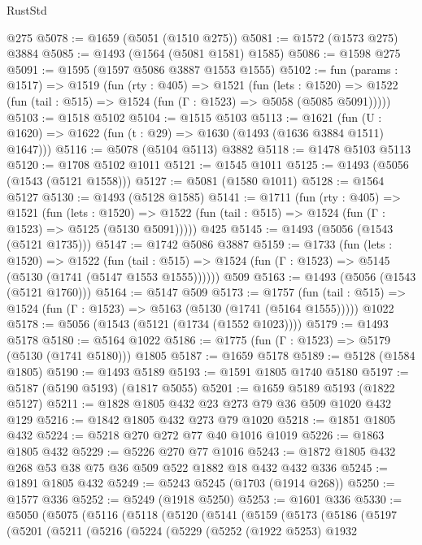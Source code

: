 \begin{lexlean}{RustStd}
\begin{coremodule}
    @275
@5078 := @1659 (@5051 (@1510 @275))
@5081 := @1572 (@1573 @275) @3884
@5085 := @1493 (@1564 (@5081 @1581) @1585)
@5086 := @1598 @275
@5091 := @1595 (@1597 @5086 @3887 @1553 @1555)
@5102 := fun (params : @1517) =>
  @1519
    (fun (rty : @405) =>
    @1521
      (fun (lets : @1520) =>
      @1522 (fun (tail : @515) => @1524 (fun (Γ : @1523) => @5058 (@5085 @5091)))))
@5103 := @1518 @5102
@5104 := @1515 @5103
@5113 := @1621 (fun (U : @1620) => @1622 (fun (t : @29) => @1630 (@1493 (@1636 @3884 @1511) @1647)))
@5116 := @5078 (@5104 @5113) @3882
@5118 := @1478 @5103 @5113
@5120 := @1708 @5102 @1011
@5121 := @1545 @1011
@5125 := @1493 (@5056 (@1543 (@5121 @1558)))
@5127 := @5081 (@1580 @1011)
@5128 := @1564 @5127
@5130 := @1493 (@5128 @1585)
@5141 := @1711
    (fun (rty : @405) =>
    @1521
      (fun (lets : @1520) =>
      @1522 (fun (tail : @515) => @1524 (fun (Γ : @1523) => @5125 (@5130 @5091)))))
    @425
@5145 := @1493 (@5056 (@1543 (@5121 @1735)))
@5147 := @1742 @5086 @3887
@5159 := @1733
    (fun (lets : @1520) =>
    @1522
      (fun (tail : @515) => @1524 (fun (Γ : @1523) => @5145 (@5130 (@1741 (@5147 @1553 @1555))))))
    @509
@5163 := @1493 (@5056 (@1543 (@5121 @1760)))
@5164 := @5147 @509
@5173 := @1757
    (fun (tail : @515) => @1524 (fun (Γ : @1523) => @5163 (@5130 (@1741 (@5164 @1555)))))
    @1022
@5178 := @5056 (@1543 (@5121 (@1734 (@1552 @1023))))
@5179 := @1493 @5178
@5180 := @5164 @1022
@5186 := @1775 (fun (Γ : @1523) => @5179 (@5130 (@1741 @5180))) @1805
@5187 := @1659 @5178
@5189 := @5128 (@1584 @1805)
@5190 := @1493 @5189
@5193 := @1591 @1805 @1740 @5180
@5197 := @5187 (@5190 @5193) (@1817 @5055)
@5201 := @1659 @5189 @5193 (@1822 @5127)
@5211 := @1828 @1805 @432 @23 @273 @79 @36 @509 @1020 @432 @129
@5216 := @1842 @1805 @432 @273 @79 @1020
@5218 := @1851 @1805 @432
@5224 := @5218 @270 @272 @77 @40 @1016 @1019
@5226 := @1863 @1805 @432
@5229 := @5226 @270 @77 @1016
@5243 := @1872 @1805 @432 @268 @53 @38 @75 @36 @509 @522 @1882 @18 @432 @432 @336
@5245 := @1891 @1805 @432
@5249 := @5243 @5245 (@1703 (@1914 @268))
@5250 := @1577 @336
@5252 := @5249 (@1918 @5250)
@5253 := @1601 @336
@5330 := @5050
    (@5075
      (@5116
        (@5118
          (@5120
            (@5141
              (@5159
                (@5173
                  (@5186
                    (@5197
                      (@5201
                        (@5211
                          (@5216
                            (@5224
                              (@5229
                                (@5252
                                  (@1922 @5253)
                                  @1932

\end{coremodule}
\end{lexlean}
